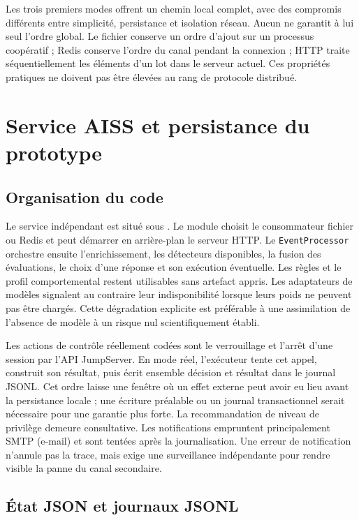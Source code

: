 \documentclass[11pt,a4paper,oneside]{report}
\theoremstyle{definition}
\theoremstyle{plain}
\begin{document}
Les trois premiers modes offrent un chemin local complet, avec des compromis
différents entre simplicité, persistance et isolation réseau. Aucun ne
garantit à lui seul l'ordre global. Le fichier conserve un ordre d'ajout sur
un processus coopératif ; Redis conserve l'ordre du canal pendant la
connexion ; HTTP traite séquentiellement les éléments d'un lot dans le
serveur actuel. Ces propriétés pratiques ne doivent pas être élevées au rang
de protocole distribué.

\section{Service AISS et persistance du prototype}

\subsection{Organisation du code}

Le service indépendant est situé sous . Le
module  choisit le consommateur fichier ou Redis et
peut démarrer en arrière-plan le serveur HTTP. Le
\texttt{EventProcessor} orchestre ensuite l'enrichissement, les détecteurs
disponibles, la fusion des évaluations, le choix d'une réponse et son
exécution éventuelle. Les règles et le profil comportemental restent
utilisables sans artefact appris. Les adaptateurs de modèles signalent au
contraire leur indisponibilité lorsque leurs poids ne peuvent pas être
chargés. Cette dégradation explicite est préférable à une assimilation de
l'absence de modèle à un risque nul scientifiquement établi.

Les actions de contrôle réellement codées sont le verrouillage et l'arrêt
d'une session par l'API JumpServer. En mode réel, l'exécuteur tente cet appel,
construit son résultat, puis écrit ensemble décision et résultat dans le
journal JSONL. Cet ordre laisse une fenêtre où un effet externe peut avoir eu
lieu avant la persistance locale ; une écriture préalable ou un journal
transactionnel serait nécessaire pour une garantie plus forte. La
recommandation de niveau de privilège demeure consultative. Les notifications
empruntent principalement SMTP (e-mail) et sont tentées après la journalisation. Une
erreur de notification n'annule pas la trace, mais exige une surveillance
indépendante pour rendre visible la panne du canal secondaire.

\subsection{État JSON et journaux JSONL}
\end{document}
